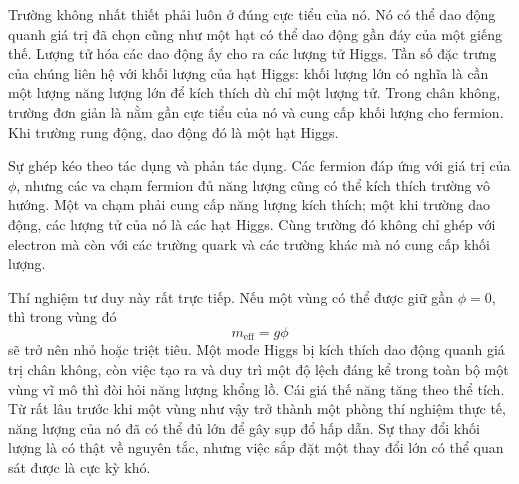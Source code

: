 Trường không nhất thiết phải luôn ở đúng cực tiểu của nó. Nó có thể dao động quanh giá trị đã chọn cũng như một hạt có thể dao động gần đáy của một giếng thế. Lượng tử hóa các dao động ấy cho ra các lượng tử Higgs. Tần số đặc trưng của chúng liên hệ với khối lượng của hạt Higgs: khối lượng lớn có nghĩa là cần một lượng năng lượng lớn để kích thích dù chỉ một lượng tử. Trong chân không, trường đơn giản là nằm gần cực tiểu của nó và cung cấp khối lượng cho fermion. Khi trường rung động, dao động đó là một hạt Higgs.

Sự ghép kéo theo tác dụng và phản tác dụng. Các fermion đáp ứng với giá trị của \(\phi\), nhưng các va chạm fermion đủ năng lượng cũng có thể kích thích trường vô hướng. Một va chạm phải cung cấp năng lượng kích thích; một khi trường dao động, các lượng tử của nó là các hạt Higgs. Cùng trường đó không chỉ ghép với electron mà còn với các trường quark và các trường khác mà nó cung cấp khối lượng.

\begin{classroomqa}
\end{classroomqa}

Thí nghiệm tư duy này rất trực tiếp. Nếu một vùng có thể được giữ gần \(\phi=0\), thì trong vùng đó
\begin{equation}
m_{\mathrm{eff}}=g\phi
\end{equation}
sẽ trở nên nhỏ hoặc triệt tiêu. Một mode Higgs bị kích thích dao động quanh giá trị chân không, còn việc tạo ra và duy trì một độ lệch đáng kể trong toàn bộ một vùng vĩ mô thì đòi hỏi năng lượng khổng lồ. Cái giá thế năng tăng theo thể tích. Từ rất lâu trước khi một vùng như vậy trở thành một phòng thí nghiệm thực tế, năng lượng của nó đã có thể đủ lớn để gây sụp đổ hấp dẫn. Sự thay đổi khối lượng là có thật về nguyên tắc, nhưng việc sắp đặt một thay đổi lớn có thể quan sát được là cực kỳ khó.

\begin{classroomqa}
\end{classroomqa}

